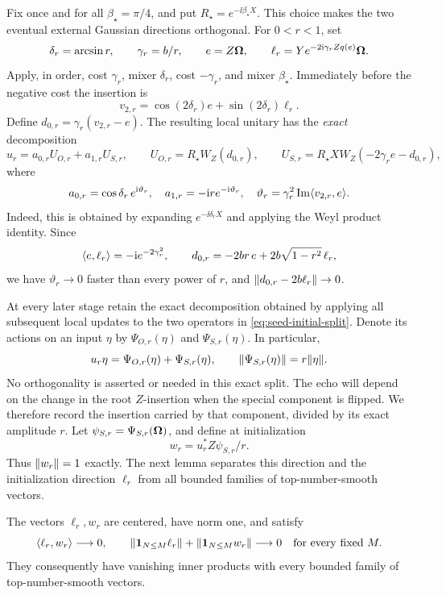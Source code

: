 Fix once and for all
\(\beta_\star=\pi/4\), and put \(R_\star=e^{-\ii\beta_\star X}\).
This choice makes the two eventual external Gaussian directions
orthogonal.  For \(0<r<1\), set
\[
 \delta_r=\arcsin r,\qquad \gamma_r=b/r,\qquad e=Z\boldsymbol\Omega,
 \qquad
 \ell_r=Y e^{-2\mathrm i\gamma_r Zq(e)}\boldsymbol\Omega.
\]
Apply, in order, cost \(\gamma_r\), mixer \(\delta_r\), cost
\(-\gamma_r\), and mixer \(\beta_\star\).  Immediately before the
negative cost the insertion is
\[
 v_{2,r}=\cos(2\delta_r)e+\sin(2\delta_r)\ell_r.
\]
Define \(d_{0,r}=\gamma_r(v_{2,r}-e)\).  The resulting local unitary
has the \emph{exact} decomposition
\begin{equation}
\label{eq:seed-initial-split}
 u_r=a_{0,r}U_{O,r}+a_{1,r}U_{S,r},\qquad
 U_{O,r}=R_\star W_Z(d_{0,r}),\qquad
 U_{S,r}=R_\star XW_Z(-2\gamma_re-d_{0,r}),
\end{equation}
where
\[
 a_{0,r}=\cos\delta_r\,e^{\mathrm i\vartheta_r},\quad
 a_{1,r}=-\mathrm i r e^{-\mathrm i\vartheta_r},\quad
 \vartheta_r=\gamma_r^2\operatorname{Im}\langle v_{2,r},e\rangle.
\]
Indeed, this is obtained by expanding \(e^{-\ii\delta_rX}\) and applying
the Weyl product identity.  Since
\[
 \langle e,\ell_r\rangle=-\mathrm i e^{-2\gamma_r^2},\qquad
 d_{0,r}=-2br\,e+2b\sqrt{1-r^2}\,\ell_r,
\]
we have \(\vartheta_r\to0\) faster than every power of \(r\), and
\(\lVert d_{0,r}-2b\ell_r\rVert\to0\).

At every later stage retain the exact decomposition obtained by applying
all subsequent local updates to the two operators in
\eqref{eq:seed-initial-split}.  Denote its actions on an input \(\eta\)
by \(\Psi_{O,r}(\eta)\) and \(\Psi_{S,r}(\eta)\).  In particular,
\begin{equation}
\label{eq:seed-exact-special-norm}
 u_r\eta=\Psi_{O,r}(\eta)+\Psi_{S,r}(\eta),\qquad
 \lVert \Psi_{S,r}(\eta)\rVert=r\lVert \eta\rVert.
\end{equation}
No orthogonality is asserted or needed in this exact split.
The echo will depend on the change in the root \(Z\)-insertion when
the special component is flipped.  We therefore record the insertion
carried by that component, divided by its exact amplitude \(r\).
Let \(\psi_{S,r}=\Psi_{S,r}(\boldsymbol\Omega)\), and define at initialization
\begin{equation}
\label{eq:seed-address-direction}
 w_r=u_r^*Z\psi_{S,r}/r.
\end{equation}
Thus \(\lVert w_r\rVert=1\) exactly.  The next lemma separates this
direction and the initialization direction \(\ell_r\) from all
bounded families of top-number-smooth vectors.

\begin{lemma}
\label{lem:seed-high-directions}
The vectors \(\ell_r,w_r\) are centered, have norm one, and satisfy
\[
 \langle \ell_r,w_r\rangle\longrightarrow0,
 \qquad
 \lVert \mathbf 1_{N\leq M}\ell_r\rVert+
 \lVert \mathbf 1_{N\leq M}w_r\rVert\longrightarrow0
 \quad\hbox{for every fixed }M.
\]
They consequently have vanishing inner products with every bounded family
of top-number-smooth vectors.
\end{lemma}

